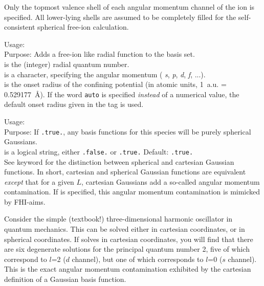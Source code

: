 Only the topmost valence shell of each angular momentum channel of the
ion is specified. All lower-lying shells are assumed to be completely
filled for the self-consistent spherical free-ion calculation.

{
  \noindent
  Usage:   
     \\[1.0ex]
  Purpose: Adds a free-ion like radial function to the basis set. \\[1.0ex]
   is the (integer) radial quantum number. \\
   is a character, specifying the angular momentum (
    \emph{s}, \emph{p}, \emph{d}, \emph{f}, ...). \\
   is the onset radius of the confining potential
    (in atomic units, 1~a.u. = 0.529177~\AA). If the word
    \texttt{auto} is specified \emph{instead} of a numerical value,
    the default onset radius given in the
     tag is used. \\
}

{
  \noindent
  Usage:   \\[1.0ex]
  Purpose: If \texttt{.true.}, any 
    basis functions for this species will be purely spherical
    Gaussians. \\[1.0ex]
   is a logical string, either \texttt{.false.} or
    \texttt{.true.} Default: \texttt{.true.} \\
}
See keyword  for the distinction between
spherical and cartesian Gaussian functions. In short, cartesian and
spherical Gaussian functions are equivalent \emph{except} that for a
given $L$, cartesian Gaussians add a so-called angular momentum
contamination. If  is specified, this
angular momentum contamination is mimicked by FHI-aims.

Consider the simple (textbook!) three-dimensional harmonic oscillator
in quantum mechanics. This can be solved either in cartesian
coordinates, or in spherical coordinates. If solves in cartesian
coordinates, you will find that there are six degenerate solutions for
the principal quantum number 2, five of which correspond to $l$=2 ($d$
channel), but one of which corresponds to $l$=0 ($s$ channel). This
is the exact angular momentum contamination exhibited by the cartesian
definition of a Gaussian basis function. 

